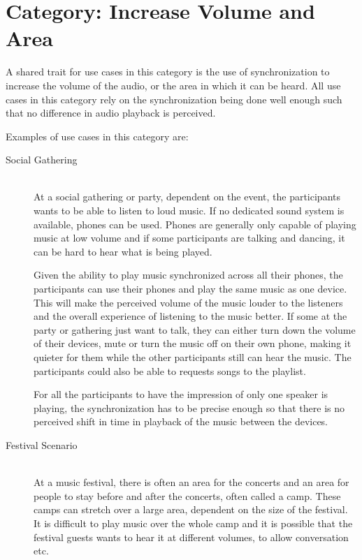 \section{Category: Increase Volume and Area}\label{sec:category_increase_volume_and_area}
A shared trait for use cases in this category is the use of synchronization to increase the volume of the audio, or the area in which it can be heard.
All use cases in this category rely on the synchronization being done well enough such that no difference in audio playback is perceived.

Examples of use cases in this category are:
\begin{description}
    \item[Social Gathering] \hfill\\
        At a social gathering or party, dependent on the event, the participants wants to be able to listen to loud music.
        If no dedicated sound system is available, phones can be used.
        Phones are generally only capable of playing music at low volume and if some participants are talking and dancing, it can be hard to hear what is being played.

        Given the ability to play music synchronized across all their phones, the participants can use their phones and play the same music as one device.
        This will make the perceived volume of the music louder to the listeners and the overall experience of listening to the music better.
        If some at the party or gathering just want to talk, they can either turn down the volume of their devices, mute or turn the music off on their own phone,
        making it quieter for them while the other participants still can hear the music.
        The participants could also be able to requests songs to the playlist.

        For all the participants to have the impression of only one speaker is playing, 
        the synchronization has to be precise enough so that there is no perceived shift in time in playback of the music between the devices.

    \item[Festival Scenario] \hfill\\
        At a music festival, there is often an area for the concerts and an area for people to stay before and after the concerts, often called a camp.
        These camps can stretch over a large area, dependent on the size of the festival.
        It is difficult to play music over the whole camp and it is possible that the festival guests wants to hear it at different volumes, to allow conversation etc.


\end{description}
